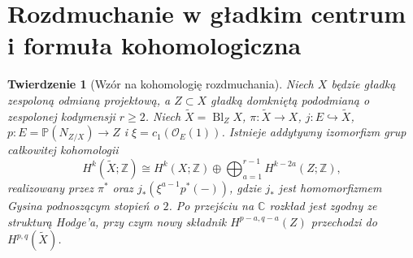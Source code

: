 \documentclass[11pt,a4paper,oneside]{report}
\newcommand{\C}{\mathbb{C}}
\newcommand{\Z}{\mathbb{Z}}
\theoremstyle{plain}
\newtheorem{twierdzenie}{Twierdzenie}[section]
\theoremstyle{definition}
\theoremstyle{remark}
\begin{document}
\section{Rozdmuchanie w gładkim centrum i formuła kohomologiczna}
\begin{twierdzenie}[Wzór na kohomologię rozdmuchania]
\label{thm:xvii-blowup-general}
Niech $X$ będzie gładką zespoloną odmianą projektową,
a $Z\subset X$ gładką domkniętą pododmianą o zespolonej
kodymensji $r\ge2$. Niech $\widetilde X=\operatorname{Bl}_Z X$,
$\pi:\widetilde X\to X$, $j:E\hookrightarrow\widetilde X$,
$p:E=\mathbb P(N_{Z/X})\to Z$ i
$\xi=c_1(\mathcal O_E(1))$.
Istnieje addytywny izomorfizm grup całkowitej kohomologii
\[
H^k(\widetilde X;\Z)\cong H^k(X;\Z)\oplus
\bigoplus_{a=1}^{r-1}H^{k-2a}(Z;\Z),
\]
realizowany przez $\pi^*$ oraz $j_*(\xi^{a-1}p^*(-))$,
gdzie $j_*$ jest homomorfizmem Gysina podnoszącym stopień o $2$.
Po przejściu na $\C$ rozkład jest zgodny ze strukturą Hodge'a,
przy czym nowy składnik $H^{p-a,q-a}(Z)$ przechodzi do
$H^{p,q}(\widetilde X)$.
\end{twierdzenie}
\end{document}
